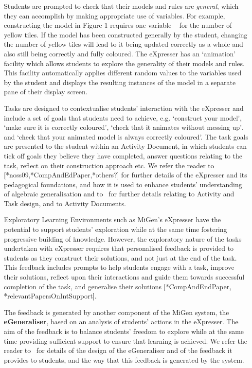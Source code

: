 Students are prompted to check that their models and rules are {\em
  general}, which they can accomplish by making appropriate use of
variables. For example, constructing the model in Figure 1 requires
one variable – for the number of yellow tiles. If the model has been
constructed generally by the student, changing the number of yellow
tiles will lead to it being updated correctly as a whole and also
still being correctly and fully coloured. The eXpresser has an
`animation' facility which allows students to explore the generality
of their models and rules. This facility automatically applies
different random values to the variables used by the student and
displays the resulting instances of the model in a separate pane of
their display screen.  

Tasks are designed to contextualise students' interaction with the
eXpresser and include a set of goals that students need to achieve,
e.g. `construct your model', `make sure it is correctly coloured',
`check that it animates without messing up', and `check that your
animated model is always correctly coloured'. The task goals are
presented to the student within an Activity Document, in which
students can tick off goals they believe they have completed, answer
questions relating to the task, reflect on their construction approach
etc. We refer the reader to [*noss09,*CompAndEdPaper,*others?] for
further details of the eXpresser and its pedagogical foundations, and
how it is used to enhance students’ understanding of algebraic
generalisation and to~\cite{CompAndEdPaper} for further details
relating to Activity and Task design, and to Activity Documents.  

Exploratory Learning Environments such as MiGen’s eXpresser
have the potential to support students' exploration while at the same
time fostering progressive building of knowledge. However, the
exploratory nature of the tasks undertaken with eXpresser requires
that personalised feedback is provided to students as they construct
their solutions, and not just at the end of the task. This feedback
includes prompts to help students engage with a task, improve their
solutions, reflect upon their interactions and guide them towards
successful completion of the task, and generalise their solutions
[*CompAndEndPaper, *relevantPapersOnIntSupport]. 

The feedback is generated by another
component of the MiGen system, the {\bf eGeneraliser}, based on an
analysis of students’ actions in the eXpresser. %
%
The aim of the
feedback is to balance students' freedom to explore while at the same
time providing sufficient support to ensure that learning is
achieved. We refer the reader to~\cite{relevantPapersOnIntSupport} for
details of the design of the eGeneraliser and of the feedback it
provides to students, and the way that this feedback is generated by
the system.  

